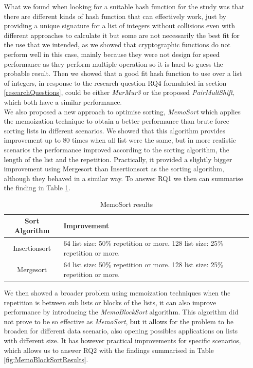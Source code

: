 \documentclass[a4paper,12pt]{article}
\begin{document}
What we found when looking for a suitable hash function for the study was that there are different kinds of hash function that can effectively work, just by providing a unique signature for a list of integers without collisions even with different approaches to calculate it but some are not necessarily the best fit for the use that we intended, as we showed that cryptographic functions do not perform well in this case, mainly because they were not design for speed performance as they perform multiple operation so it is hard to guess the probable result. Then we showed that a good fit hash function to use over a list of integers, in response to the research question RQ4 formulated in section \ref{researchQuestions}, could be either  {\it MurMur3}  or the proposed  {\it PairMultShift}, which both have a similar performance.\\

We also proposed a new approach to optimise sorting, {\it MemoSort} which applies the memoization technique to obtain a better performance than brute force sorting lists in different scenarios. We showed that this algorithm provides improvement up to 80 times when all list were the same, but in more realistic scenarios the performance improved according to the sorting algorithm, the length of the list and the repetition. Practically, it provided a slightly bigger improvement using Mergesort than Insertionsort as the sorting algorithm, although they behaved in a similar way. To answer RQ1 we then can summarise the finding in Table \ref{fig:MemoSortResults}.

\begin{table}[H]
\centering
\begin{tabular}{|c|p{70mm}|}   \hline
	{Sort Algorithm} & {Improvement} \\  \hline
	Insertionsort & 64 list size: 50\% repetition or more. 128 list size: 25\% repetition or more.\\ 
	Mergesort & 64 list size: 50\% repetition or more. 128 list size: 25\% repetition or more. \\  \hline
\end{tabular}
\caption{MemoSort results}
\label{fig:MemoSortResults}
\end{table}


We then showed a broader problem using memoization techniques when the repetition is between sub lists or blocks of the lists, it can also improve performance by introducing the {\it MemoBlockSort} algorithm. This algorithm did not prove to be so effective as {\it MemoSort}, but it allows for the problem to be broaden for different data scenario, also opening possibles applications on lists with different size.  It has however practical improvements for specific scenarios, which allows us to answer RQ2 with the findings summarised in Table \ref{fig:MemoBlockSortResults}.
\end{document}
